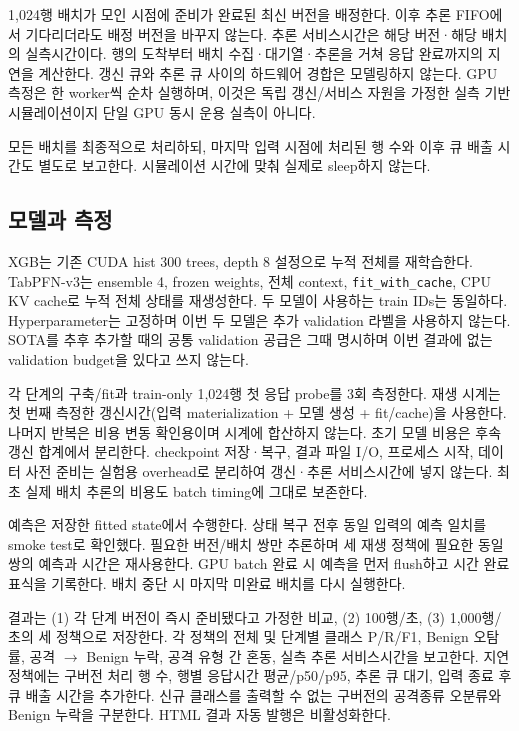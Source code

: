 1,024행 배치가 모인 시점에 준비가 완료된 최신 버전을 배정한다. 이후 추론 FIFO에서 기다리더라도 배정 버전을 바꾸지 않는다. 추론 서비스시간은 해당 버전·해당 배치의 실측시간이다. 행의 도착부터 배치 수집·대기열·추론을 거쳐 응답 완료까지의 지연을 계산한다. 갱신 큐와 추론 큐 사이의 하드웨어 경합은 모델링하지 않는다. GPU 측정은 한 worker씩 순차 실행하며, 이것은 독립 갱신/\allowbreak{}서비스 자원을 가정한 실측 기반 시뮬레이션이지 단일 GPU 동시 운용 실측이 아니다.

모든 배치를 최종적으로 처리하되, 마지막 입력 시점에 처리된 행 수와 이후 큐 배출 시간도 별도로 보고한다. 시뮬레이션 시간에 맞춰 실제로 sleep하지 않는다.

\subsection{모델과 측정}
XGB는 기존 CUDA hist 300 trees, depth 8 설정으로 누적 전체를 재학습한다. TabPFN-v3는 ensemble 4, frozen weights, 전체 context, \texttt{fit\_\allowbreak{}\allowbreak{}with\allowbreak{}\_\allowbreak{}\allowbreak{}cache}, CPU KV cache로 누적 전체 상태를 재생성한다. 두 모델이 사용하는 train IDs는 동일하다. Hyperparameter는 고정하며 이번 두 모델은 추가 validation 라벨을 사용하지 않는다. SOTA를 추후 추가할 때의 공통 validation 공급은 그때 명시하며 이번 결과에 없는 validation budget을 있다고 쓰지 않는다.

각 단계의 구축/\allowbreak{}fit과 train-only 1,024행 첫 응답 probe를 3회 측정한다. 재생 시계는 첫 번째 측정한 갱신시간(입력 materialization +\allowbreak{} 모델 생성 +\allowbreak{} fit/\allowbreak{}cache)을 사용한다. 나머지 반복은 비용 변동 확인용이며 시계에 합산하지 않는다. 초기 모델 비용은 후속 갱신 합계에서 분리한다. checkpoint 저장·복구, 결과 파일 I/\allowbreak{}O, 프로세스 시작, 데이터 사전 준비는 실험용 overhead로 분리하여 갱신·추론 서비스시간에 넣지 않는다. 최초 실제 배치 추론의 비용도 batch timing에 그대로 보존한다.

예측은 저장한 fitted state에서 수행한다. 상태 복구 전후 동일 입력의 예측 일치를 smoke test로 확인했다. 필요한 버전/\allowbreak{}배치 쌍만 추론하며 세 재생 정책에 필요한 동일 쌍의 예측과 시간은 재사용한다. GPU batch 완료 시 예측을 먼저 flush하고 시간 완료 표식을 기록한다. 배치 중단 시 마지막 미완료 배치를 다시 실행한다.

결과는 (1) 각 단계 버전이 즉시 준비됐다고 가정한 비교, (2) 100행/\allowbreak{}초, (3) 1,000행/\allowbreak{}초의 세 정책으로 저장한다. 각 정책의 전체 및 단계별 클래스 P/\allowbreak{}R/\allowbreak{}F1, Benign 오탐률, 공격 \ensuremath{\rightarrow} Benign 누락, 공격 유형 간 혼동, 실측 추론 서비스시간을 보고한다. 지연 정책에는 구버전 처리 행 수, 행별 응답시간 평균/\allowbreak{}p50/\allowbreak{}p95, 추론 큐 대기, 입력 종료 후 큐 배출 시간을 추가한다. 신규 클래스를 출력할 수 없는 구버전의 공격종류 오분류와 Benign 누락을 구분한다. HTML 결과 자동 발행은 비활성화한다.

